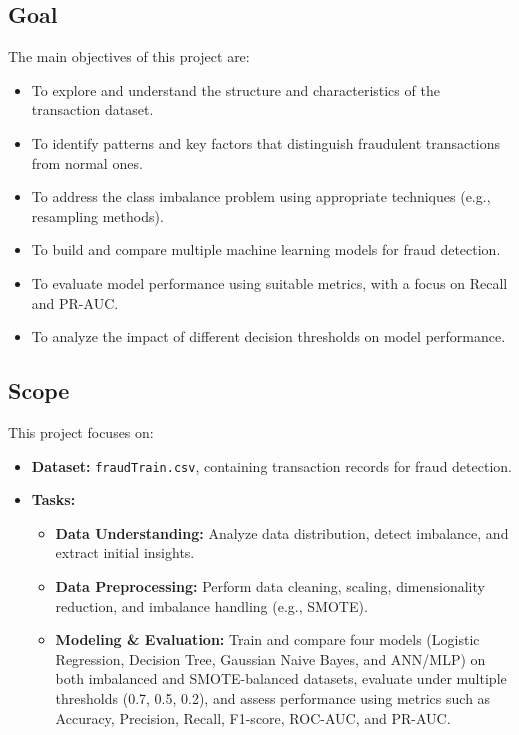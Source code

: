 \subsection{Goal}
The main objectives of this project are:
\begin{itemize} 
    \item To explore and understand the structure and characteristics of the transaction dataset.
    \item To identify patterns and key factors that distinguish fraudulent transactions from normal ones.
    \item To address the class imbalance problem using appropriate techniques (e.g., resampling methods).
    \item To build and compare multiple machine learning models for fraud detection.
    \item To evaluate model performance using suitable metrics, with a focus on Recall and PR-AUC.
    \item To analyze the impact of different decision thresholds on model performance.
\end{itemize}



\subsection{Scope}
This project focuses on:
\begin{itemize}
    \item \textbf{Dataset:} \texttt{fraudTrain.csv}, containing transaction records for fraud detection.
    
    \item \textbf{Tasks:}
    \begin{itemize} 
        \item \textbf{Data Understanding:} Analyze data distribution, detect imbalance, and extract initial insights.
        
        \item \textbf{Data Preprocessing:} Perform data cleaning, scaling, dimensionality reduction, and imbalance handling (e.g., SMOTE).

        \item \textbf{Modeling \& Evaluation:} Train and compare four models (Logistic Regression, Decision Tree, Gaussian Naive Bayes, and ANN/MLP) on both imbalanced and SMOTE-balanced datasets, evaluate under multiple thresholds (0.7, 0.5, 0.2), and assess performance using metrics such as Accuracy, Precision, Recall, F1-score, ROC-AUC, and PR-AUC.
    \end{itemize}

\end{itemize}